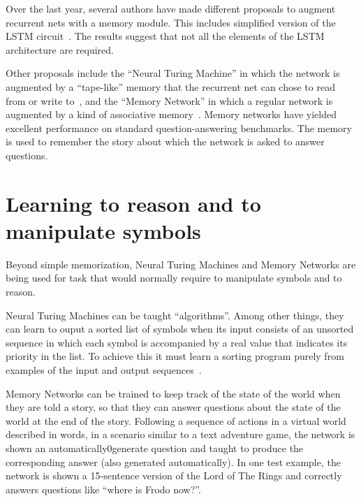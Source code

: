 \documentclass[10pts]{article}
\begin{document}
Over the last year, several authors have made different proposals to
augment recurrent nets with a memory module. This includes simplified
version of the LSTM
circuit~\citep{Chung-et-al-NIPSDL2014-small,Yao-et-al-SLU-workshop2014}.
The results suggest that not all the elements of the LSTM architecture
are required.


Other proposals include the ``Neural Turing Machine'' in which the
network is augmented by a ``tape-like'' memory that the recurrent net
can chose to read from or write to~\citep{Graves-et-al-arxiv2014}, and
the ``Memory Network'' in which a regular network is augmented by a
kind of associative memory~\citep{weston-memorynet-2014}. Memory
networks have yielded excellent performance on standard
question-answering benchmarks. The memory is used to remember the
story about which the network is asked to answer questions.




\section{Learning to reason and to manipulate symbols}

Beyond simple memorization, Neural Turing Machines and Memory Networks
are being used for task that would normally require to manipulate
symbols and to reason.

Neural Turing Machines can be taught ``algorithms''. Among other
things, they can learn to ouput a sorted list of symbols when its
input consists of an unsorted sequence in which each symbol is
accompanied by a real value that indicates its priority in the list.
To achieve this it must learn a sorting program purely from examples
of the input and output sequences~\citep{Graves-et-al-arxiv2014}.

Memory Networks can be trained to keep track of the state of the world
when they are told a story, so that they can answer questions about
the state of the world at the end of the story. Following a sequence
of actions in a virtual world described in words, in a scenario
similar to a text adventure game, the network is shown an
automatically0generate question and taught to produce the
corresponding answer (also generated automatically).  In one test
example, the network is shown a 15-sentence version of the Lord of The
Rings and correctly answers questions like ``where is Frodo now?''.
~\citep{weston-memorynet-2014}
\end{document}
